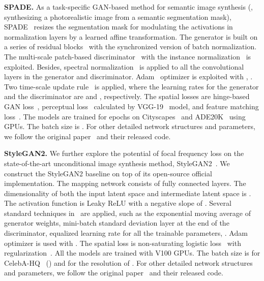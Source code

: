 \documentclass[10pt,twocolumn,letterpaper]{article}
\begin{document}
\vspace{0.05cm}
\noindent
\textbf{SPADE.}
As a task-specific GAN-based method for semantic image synthesis (\ie, synthesizing a photorealistic image from a semantic segmentation mask), SPADE~\cite{SPADE} resizes the segmentation mask for modulating the activations in normalization layers by a learned affine transformation.
The generator is built on a series of residual blocks~\cite{resnet} with the synchronized version of batch normalization. The multi-scale patch-based discriminator~\cite{pix2pixhd} with the instance normalization~\cite{IN} is exploited. Besides, spectral normalization~\cite{spectralnorm} is applied to all the convolutional layers in the generator and discriminator.
Adam~\cite{adam} optimizer is exploited with , . Two time-scale update rule~\cite{TTUR} is applied, where the learning rates for the generator and the discriminator are  and , respectively.
The spatial losses are hinge-based GAN loss~\cite{geometricgan,spectralnorm,selfattentiongan}, perceptual loss~\cite{perceptualloss} calculated by VGG-19~\cite{vgg} model, and feature matching loss~\cite{pix2pixhd}.
The models are trained for  epochs on Cityscapes~\cite{cityscapes} and ADE20K~\cite{ade20k} using  GPUs. The batch size is .
For other detailed network structures and parameters, we follow the original paper~\cite{SPADE} and their released code.


\vspace{0.05cm}
\noindent
\textbf{StyleGAN2.}
We further explore the potential of focal frequency loss on the state-of-the-art unconditional image synthesis method, StyleGAN2~\cite{stylegan2}.
We construct the StyleGAN2 baseline on top of its open-source official implementation.
The mapping network consists of  fully connected layers. The dimensionality of both the input latent space and intermediate latent space is .
The activation function is Leaky ReLU with a negative slope of .
Several standard techniques in~\cite{pggan,stylegan} are applied, such as the exponential moving average of generator weights, mini-batch standard deviation layer at the end of the discriminator, equalized learning rate for all the trainable parameters, \etc.
Adam~\cite{adam} optimizer is used with .
The spatial loss is non-saturating logistic loss~\cite{GAN,stylegan2} with  regularization~\cite{ganstability}.
All the models are trained with  V100 GPUs. The batch size is  for CelebA-HQ~\cite{pggan} () and  for the resolution of .
For other detailed network structures and parameters, we follow the original paper~\cite{stylegan2} and their released code.
\end{document}
